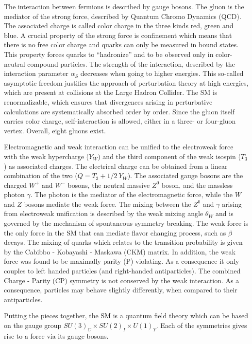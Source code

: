 The interaction between fermions is described by gauge bosons. The gluon is the mediator of the strong force, described by Quantum Chromo Dynamics (QCD). The associated charge is called color charge in the three kinds red, green and blue.
A crucial property of the strong force is confinement 
which means that there is no free color charge and quarks can only be measured in bound states.
This property forces quarks to ``hadronize'' and to be observed only in color-neutral compound particles.
The strength of the interaction, described by the interaction parameter
$\alpha_S$ decreases when going to higher energies.
This so-called asymptotic freedom justifies the approach of perturbation theory at high energies, which are present at collisions at the Large Hadron Collider.
The SM is renormalizable, which ensures that divergences arising in perturbative calculations are systematically absorbed order by order.
Since the gluon itself carries color charge, self-interaction is allowed, either in a three- or four-gluon vertex. Overall, eight gluons exist.

Electromagnetic and weak interaction can be unified to the electroweak force
with the weak hypercharge ($Y_W$) and the third component of the weak isospin ($T_3$) as associated charges.
The electrical charge can be obtained from a linear combination of the two ($Q=T_3+1/2~Y_W$).
The associated gauge bosons are the charged $W^+$ and $W^-$ bosons, the neutral massive $Z^0$ boson, and the massless photon $\gamma$.
The photon is the mediator of the electromagnetic force, while the $W$ and $Z$ bosons mediate the weak force.
The mixing between the $Z^0$ and $\gamma$ arising from electroweak unification is described by the weak mixing angle $\theta_W$ and is governed by the mechanism of spontaneous symmetry breaking.
The weak force is the only force in the SM that can mediate flavor changing 
process, such as $\beta$ decays.
The mixing of quarks which relates to the transition probability is given by the
Cabibbo - Kobayashi - Maskawa (CKM) matrix.
In addition, the weak force was found to be maximally parity (P) violating.
As a consequence it only couples to left handed particles (and right-handed antiparticles). The combined Charge - Parity (CP) symmetry is not conserved
by the weak interaction. As a consequence, particles may behave slightly differently, when compared to their antiparticles.

Putting the pieces together, the SM is a quantum field theory which can be based on the gauge group $SU(3)_C \times SU(2)_I \times U(1)_Y$.
Each of the symmetries gives rise to a force via its gauge bosons.

